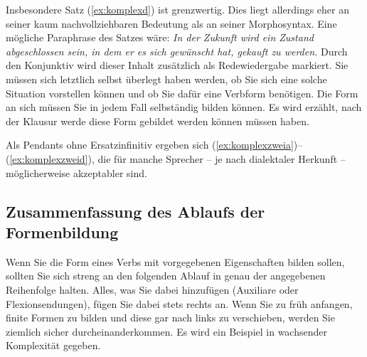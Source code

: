 Insbesondere Satz (\ref{ex:komplexd}) ist grenzwertig.
Dies liegt allerdings eher an seiner kaum nachvollziehbaren Bedeutung als an seiner Morphosyntax.
Eine mögliche Paraphrase des Satzes wäre:
\textit{In der Zukunft wird ein Zustand abgeschlossen sein, in dem er es sich gewünscht hat, gekauft zu werden.}
Durch den Konjunktiv wird dieser Inhalt zusätzlich als Redewiedergabe markiert.
Sie müssen sich letztlich selbst überlegt haben werden, ob Sie sich eine solche Situation vorstellen können und ob Sie dafür eine Verbform benötigen.
Die Form an sich müssen Sie in jedem Fall selbständig bilden können.
Es wird erzählt, nach der Klausur werde diese Form gebildet werden können müssen haben.

Als Pendants ohne Ersatzinfinitiv ergeben sich (\ref{ex:komplexzweia})--(\ref{ex:komplexzweid}), die für manche Sprecher -- je nach dialektaler Herkunft -- möglicherweise akzeptabler sind.

\begin{exe}
\end{exe}

\subsection{Zusammenfassung des Ablaufs der Formenbildung}

Wenn Sie die Form eines Verbs mit vorgegebenen Eigenschaften bilden sollen, sollten Sie sich streng an den folgenden Ablauf in genau der angegebenen Reihenfolge halten.
Alles, was Sie dabei hinzufügen (Auxiliare oder Flexionsendungen), fügen Sie dabei stets rechts an.
Wenn Sie zu früh anfangen, finite Formen zu bilden und diese gar nach links zu verschieben, werden Sie ziemlich sicher durcheinanderkommen.
Es wird ein Beispiel in wachsender Komplexität gegeben.

